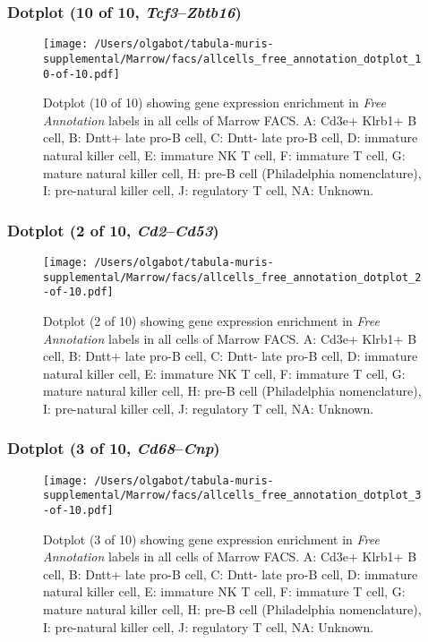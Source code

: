 \clearpage

\subsubsection{Dotplot (10 of 10, \emph{Tcf3}--\emph{Zbtb16})}
\begin{figure}[h]
\centering
\texttt{[image: /Users/olgabot/tabula-muris-supplemental/Marrow/facs/allcells\_free\_annotation\_dotplot\_10-of-10.pdf]}

\caption{ Dotplot (10 of 10)  showing gene expression enrichment in \emph{Free Annotation} labels in all cells of Marrow FACS. A: Cd3e+ Klrb1+ B cell, B: Dntt+ late pro-B cell, C: Dntt- late pro-B cell, D: immature natural killer cell, E: immature NK T cell, F: immature T cell, G: mature natural killer cell, H: pre-B cell (Philadelphia nomenclature), I: pre-natural killer cell, J: regulatory T cell, NA: Unknown.}
\end{figure}


\clearpage

\subsubsection{Dotplot (2 of 10, \emph{Cd2}--\emph{Cd53})}
\begin{figure}[h]
\centering
\texttt{[image: /Users/olgabot/tabula-muris-supplemental/Marrow/facs/allcells\_free\_annotation\_dotplot\_2-of-10.pdf]}

\caption{ Dotplot (2 of 10)  showing gene expression enrichment in \emph{Free Annotation} labels in all cells of Marrow FACS. A: Cd3e+ Klrb1+ B cell, B: Dntt+ late pro-B cell, C: Dntt- late pro-B cell, D: immature natural killer cell, E: immature NK T cell, F: immature T cell, G: mature natural killer cell, H: pre-B cell (Philadelphia nomenclature), I: pre-natural killer cell, J: regulatory T cell, NA: Unknown.}
\end{figure}


\clearpage

\subsubsection{Dotplot (3 of 10, \emph{Cd68}--\emph{Cnp})}
\begin{figure}[h]
\centering
\texttt{[image: /Users/olgabot/tabula-muris-supplemental/Marrow/facs/allcells\_free\_annotation\_dotplot\_3-of-10.pdf]}

\caption{ Dotplot (3 of 10)  showing gene expression enrichment in \emph{Free Annotation} labels in all cells of Marrow FACS. A: Cd3e+ Klrb1+ B cell, B: Dntt+ late pro-B cell, C: Dntt- late pro-B cell, D: immature natural killer cell, E: immature NK T cell, F: immature T cell, G: mature natural killer cell, H: pre-B cell (Philadelphia nomenclature), I: pre-natural killer cell, J: regulatory T cell, NA: Unknown.}
\end{figure}


